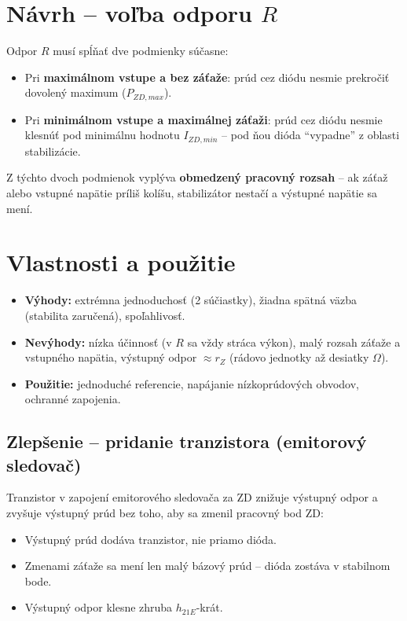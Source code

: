 \section{Návrh -- voľba odporu $R$}

Odpor $R$ musí spĺňať dve podmienky súčasne:
\begin{itemize}
    \item Pri \textbf{maximálnom vstupe a bez záťaže}: prúd cez diódu nesmie prekročiť dovolený maximum ($P_{ZD,max}$).
    \item Pri \textbf{minimálnom vstupe a maximálnej záťaži}: prúd cez diódu nesmie klesnúť pod minimálnu hodnotu $I_{ZD,min}$ -- pod ňou dióda ``vypadne'' z oblasti stabilizácie.
\end{itemize}

Z týchto dvoch podmienok vyplýva \textbf{obmedzený pracovný rozsah} -- ak záťaž alebo vstupné napätie príliš kolíšu, stabilizátor nestačí a výstupné napätie sa mení.

\section{Vlastnosti a použitie}

\begin{itemize}
    \item \textbf{Výhody:} extrémna jednoduchosť (2 súčiastky), žiadna spätná väzba (stabilita zaručená), spoľahlivosť.
    \item \textbf{Nevýhody:} nízka účinnosť (v $R$ sa vždy stráca výkon), malý rozsah záťaže a vstupného napätia, výstupný odpor $\approx r_Z$ (rádovo jednotky až desiatky $\Omega$).
    \item \textbf{Použitie:} jednoduché referencie, napájanie nízkoprúdových obvodov, ochranné zapojenia.
\end{itemize}

\subsection{Zlepšenie -- pridanie tranzistora (emitorový sledovač)}

Tranzistor v zapojení emitorového sledovača za ZD znižuje výstupný odpor a zvyšuje výstupný prúd bez toho, aby sa zmenil pracovný bod ZD:
\begin{itemize}[noitemsep]
    \item Výstupný prúd dodáva tranzistor, nie priamo dióda.
    \item Zmenami záťaže sa mení len malý bázový prúd -- dióda zostáva v stabilnom bode.
    \item Výstupný odpor klesne zhruba $h_{21E}$-krát.
\end{itemize}

